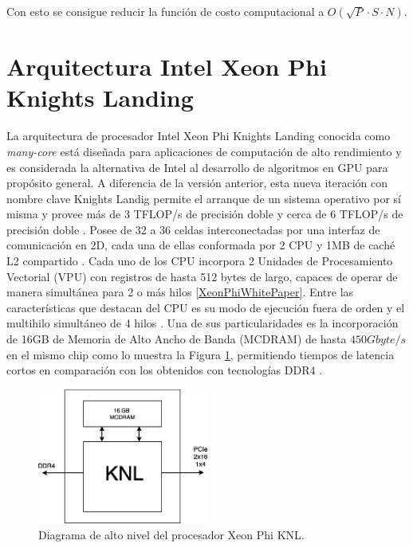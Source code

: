 Con esto se consigue reducir la  función de costo computacional a $O(\sqrt{P} \cdot S \cdot N)$.  



\section{Arquitectura Intel Xeon Phi Knights Landing}
\label{ch:marco_xeonphi}

La arquitectura de procesador Intel Xeon Phi Knights Landing conocida como \textit{many-core} está dise\~nada para aplicaciones de computación de alto rendimiento y es considerada la alternativa de Intel al desarrollo de algoritmos en GPU para propósito general. A diferencia de la versión anterior, esta nueva iteración con nombre clave Knights Landig permite el arranque de un sistema operativo por sí misma y provee más de 3 TFLOP/s de precisión doble y cerca de 6 TFLOP/s de precisión doble \cite{Jeffers201663}. Posee de 32 a 36 celdas interconectadas por una interfaz de comunicación en 2D, cada una de ellas conformada por 2 CPU y 1MB de caché L2 compartido \cite{XeonPhiWhitePaper}. Cada uno de los CPU incorpora 2 Unidades de Procesamiento Vectorial (VPU) con registros de hasta 512 bytes de largo, capaces de operar de manera simultánea para 2 o más hilos \ref{XeonPhiWhitePaper}. 
Entre las características que destacan del CPU es su modo de ejecución fuera de orden y el multihilo simultáneo de 4 hilos \cite{XeonPhiWhitePaper}. Una de sus particularidades es la incorporación de 16GB de Memoria de Alto Ancho de Banda (MCDRAM) de hasta $450 Gbyte/s$ en el mismo chip como lo muestra la Figura \ref{fig:cpu_phi}, permitiendo tiempos de latencia cortos en comparación con los obtenidos con tecnologías DDR4 \cite{XeonPhiWhitePaper}.

\begin{figure}
\centering
\includegraphics[width=0.5\textwidth]{fig/cpu}
\caption{Diagrama de alto nivel del procesador Xeon Phi KNL.}
\label{fig:cpu_phi}
\end{figure}


